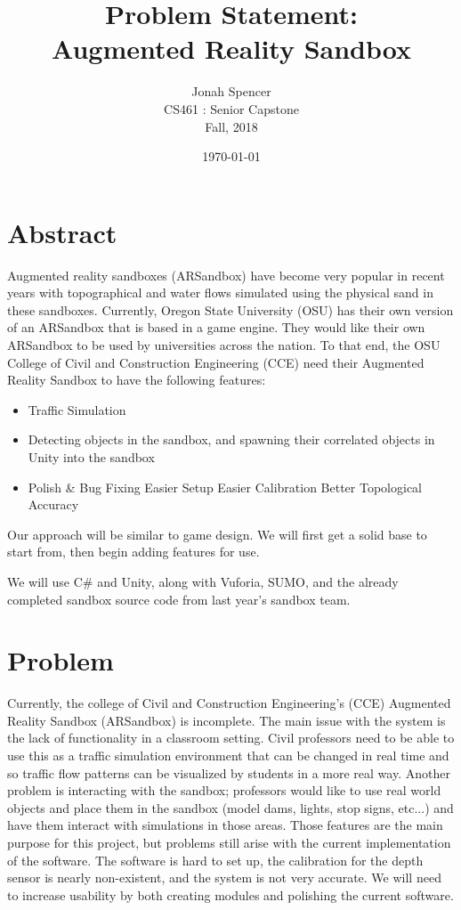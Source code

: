 \documentclass[10pt,draftclsnofoot,onecolumn]{IEEEtran}
\title{Problem Statement:\\Augmented Reality Sandbox}
\author{Jonah Spencer \\ CS461 : Senior Capstone \\ Fall, 2018}
\date{\today}
\begin{document}
\maketitle
\section*{Abstract}
\begin{flushleft}
       \qquad Augmented reality sandboxes (ARSandbox) have become very popular in recent years with topographical and water flows simulated using the physical sand in these sandboxes. Currently, Oregon State University (OSU) has their own version of an ARSandbox that is based in a game engine. They would like their own ARSandbox to be used by universities across the nation. To that end, the OSU College of Civil and Construction Engineering (CCE) need their Augmented Reality Sandbox to have the following features:
       \begin{itemize}
           \item Traffic Simulation
           \item Detecting objects in the sandbox, and spawning their correlated objects in Unity into the sandbox
           \item Polish \& Bug Fixing
           \subitem Easier Setup
           \subitem Easier Calibration
           \subitem Better Topological Accuracy
       \end{itemize}
       Our approach will be similar to game design. We will first get a solid base to start from, then begin adding features for use. 
\end{flushleft}       
\begin{flushleft}
    \qquad We will use C\# and Unity, along with Vuforia, SUMO, and the already completed sandbox source code from last year's sandbox team. 
\end{flushleft}

\newpage
\section{Problem}
\begin{flushleft}
    \qquad Currently, the college of Civil and Construction Engineering's (CCE) Augmented Reality Sandbox (ARSandbox) is incomplete. The main issue with the system is the lack of functionality in a classroom setting. Civil professors need to be able to use this as a traffic simulation environment that can be changed in real time and so traffic flow patterns can be visualized by students in a  more real way. Another problem is interacting with the sandbox; professors would like to use real world objects and place them in the sandbox (model dams, lights, stop signs, etc...) and have  them interact with simulations in those areas. Those features are the main purpose for this project, but problems still arise with the current implementation of the software. The software is hard to set up, the calibration for the depth sensor is nearly non-existent, and the system is not very accurate. We will need to increase usability by both creating modules and polishing the current software.
\end{flushleft}
\end{document}
